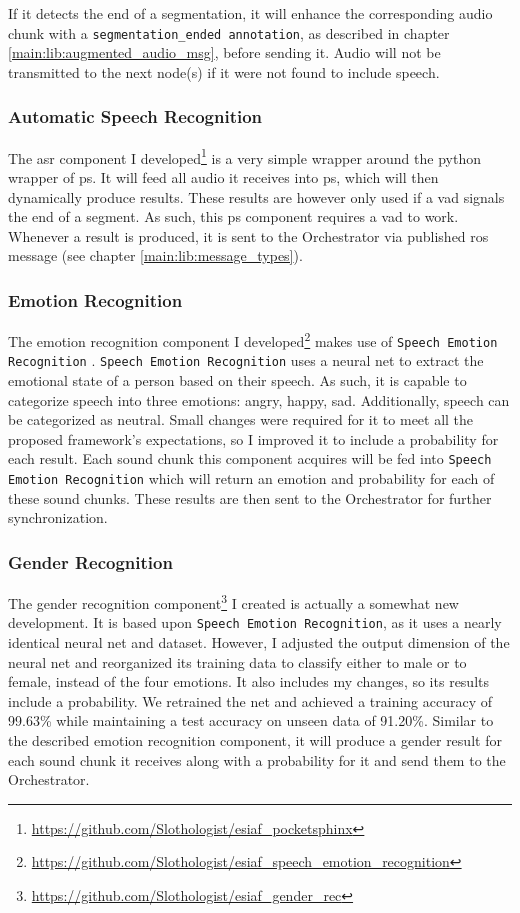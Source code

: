 If it detects the end of a segmentation, it will enhance the corresponding audio chunk with a \texttt{segmentation\_ended annotation}, as described in chapter \ref{main:lib:augmented_audio_msg}, before sending it.
Audio will not be transmitted to the next node(s) if it were not found to include speech.

\subsubsection{Automatic Speech Recognition}
\label{main:components:ps}
The \gls{asr} component I developed\footnote{\url{https://github.com/Slothologist/esiaf_pocketsphinx}} is a very simple wrapper around the python wrapper of \gls{ps}.
It will feed all audio it receives into \gls{ps}, which will then dynamically produce results.
These results are however only used if a \gls{vad} signals the end of a segment.
As such, this \gls{ps} component requires a \gls{vad} to work.
Whenever a result is produced, it is sent to the Orchestrator via published \gls{ros} message (see chapter \ref{main:lib:message_types}).

\subsubsection{Emotion Recognition}
\label{main:components:emotion}
The emotion recognition component I developed\footnote{\url{https://github.com/Slothologist/esiaf_speech_emotion_recognition}} makes use of \texttt{Speech Emotion Recognition} \cite{speech-em-rec}.
\texttt{Speech Emotion Recognition} uses a neural net to extract the emotional state of a person based on their speech.
As such, it is capable to categorize speech into three emotions: angry, happy, sad.
Additionally, speech can be categorized as neutral.
Small changes were required for it to meet all the proposed framework's expectations, so I improved it to include a probability for each result. %
Each sound chunk this component acquires will be fed into \texttt{Speech Emotion Recognition} which will return an emotion and probability for each of these sound chunks.
These results are then sent to the Orchestrator for further synchronization.

\subsubsection{Gender Recognition}
\label{main:components:gender}
The gender recognition component\footnote{\url{https://github.com/Slothologist/esiaf_gender_rec}} I created is actually a somewhat new development.
It is based upon \texttt{Speech Emotion Recognition}, as it uses a nearly identical neural net and dataset.
However, I adjusted the output dimension of the neural net and reorganized its training data to classify either to male or to female, instead of the four emotions.
It also includes my changes, so its results include a probability.
We retrained the net and achieved a training accuracy of 99.63\% while maintaining a test accuracy on unseen data of 91.20\%.
Similar to the described emotion recognition component, it will produce a gender result for each sound chunk it receives along with a probability for it and send them to the Orchestrator.

